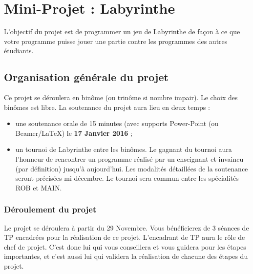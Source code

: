 \documentclass[french,12pt,a4paper,twoside,openright,titlepage]{report}
\begin{document}
\chead[]{}
 
{

}
{
}

\cfoot[]{}
\rfoot[\thepage]{\thepage}




\pagestyle{fancyplain}


\chapter*{Mini-Projet : Labyrinthe}

L'objectif du projet est de programmer un jeu de Labyrinthe de façon à ce que votre programme puisse jouer une partie contre les programmes des autres étudiants.

\section{Organisation générale du projet}

Ce projet se déroulera en binôme (ou trinôme si nombre impair). Le choix des binômes est libre. La soutenance du projet aura lieu en deux temps : 
\begin{itemize}
\item une soutenance orale de 15 minutes (avec supports Power-Point (ou Beamer/\LaTeX) le \textbf{17 Janvier 2016} ;
\item un tournoi de Labyrinthe entre les binômes. Le gagnant du tournoi aura l'honneur de rencontrer un programme réalisé par un enseignant et invaincu (par définition) jusqu'à aujourd'hui. Les modalités détaillées de la soutenance seront précisées mi-décembre. Le tournoi sera commun entre les spécialités ROB et MAIN.
\end{itemize}

\subsection{Déroulement du projet}
Le projet se déroulera à partir du 29 Novembre. Vous bénéficierez de 3 séances de TP encadrées pour la réalisation de ce projet. L'encadrant de TP aura le rôle de chef de projet. C'est donc lui qui vous conseillera et vous guidera pour les étapes importantes, et c'est aussi lui qui validera la réalisation de chacune des étapes du projet.
\end{document}
